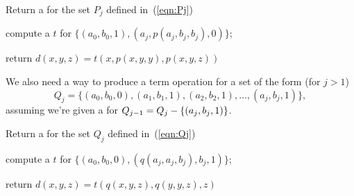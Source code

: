   \LinesNumbered
  \begin{algorithm}%

  \caption{Return a \ldto for the set $P_j$ defined in~(\ref{eqn:Pj})
  \label{alg:ild0}}

  compute a \ldto $t$ for $\{(a_0, b_0, 1), (a_j, p(a_j, b_j, b_j), 0)\}$;

  return $d(x,y,z) = t(x, p(x,y,y), p(x,y,z))$

  \end{algorithm}


  We also need a way to produce a \ld
  term operation for a set of the form  (for $j>1$)
  \begin{equation}
  \label{eqn:Qj}
  Q_{j} = \{(a_0, b_0, 0), (a_1, b_1, 1), (a_2, b_2, 1), \dots,
  (a_{j}, b_{j}, 1)\},
  \end{equation}
  assuming we're given a \ldto for
  $Q_{j-1} = Q_j - \{(a_j, b_j, 1)\}$.

  \LinesNumbered
  \begin{algorithm}%
    \caption{Return a \ldto for the set $Q_j$ defined in~(\ref{eqn:Qj})
    \label{alg:ild1}}

    compute a \ldto $t$ for $\{(a_0, b_0, 0), (q(a_j, a_j, b_j), b_j, 1)\}$;

    return $d(x,y,z) = t(q(x,y,z), q(y,y,z), z)$
  \end{algorithm}


